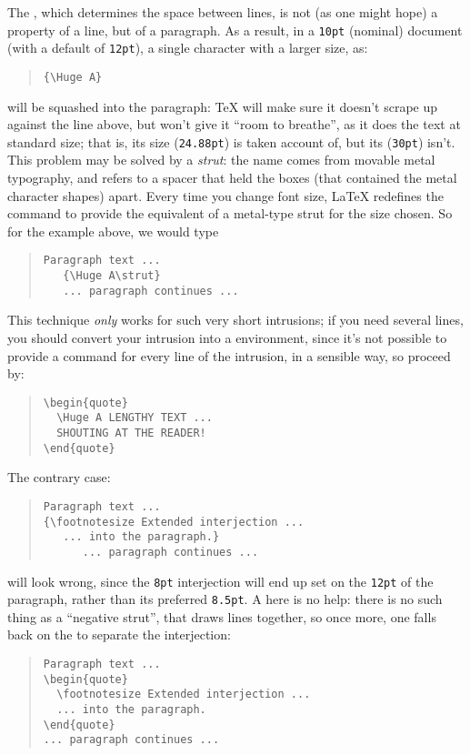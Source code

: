 The , which determines the space between lines, is
not (as one might hope) a property of a line, but of a paragraph.  As
a result, in a \texttt{10pt} (nominal) document (with a default
 of \texttt{12pt}), a single character with a larger
size, as:
\begin{quote}
\begin{verbatim}
{\Huge A}
\end{verbatim}
\end{quote}
will be squashed into the paragraph: \TeX{} will make sure it doesn't
scrape up against the line above, but won't give it ``room to
breathe'', as it does the text at standard size; that is, its size
(\texttt{24.88pt}) is taken account of, but its 
(\texttt{30pt}) isn't.  This problem may be solved by a \emph{strut}:
the name comes from movable metal typography, and refers to a spacer
that held the boxes (that contained the metal character shapes) apart.
Every time you change font size, \LaTeX{} redefines the command
 to provide the equivalent of a metal-type strut for the
size chosen.  So for the example above, we would type
\begin{quote}
\begin{verbatim}
Paragraph text ...
   {\Huge A\strut}
   ... paragraph continues ...
\end{verbatim}
\end{quote}
This technique \emph{only} works for such very short intrusions; if
you need several lines, you should convert your intrusion into a
 environment, since it's not possible to provide a
 command for every line of the intrusion, in a sensible
way, so proceed by:
\begin{quote}
\begin{verbatim}
\begin{quote}
  \Huge A LENGTHY TEXT ...
  SHOUTING AT THE READER!
\end{quote}
\end{verbatim}
\end{quote}

The contrary case:
\begin{quote}
\begin{verbatim}
Paragraph text ...
{\footnotesize Extended interjection ...
   ... into the paragraph.}
      ... paragraph continues ...
\end{verbatim}
\end{quote}
will look wrong, since the \texttt{8pt} interjection will
end up set on the \texttt{12pt}  of the paragraph,
rather than its preferred \texttt{8.5pt}.  A  here is no
help: there is no such thing as a ``negative strut'', that draws lines
together, so once more, one falls back on the  to
separate the interjection:
\begin{quote}
\begin{verbatim}
Paragraph text ...
\begin{quote}
  \footnotesize Extended interjection ...
  ... into the paragraph.
\end{quote}
... paragraph continues ...
\end{verbatim}
\end{quote}

